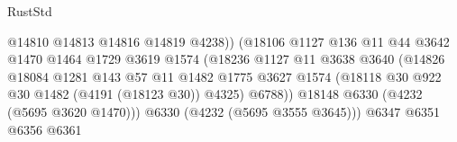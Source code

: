 \begin{lexlean}{RustStd}
\begin{coremodule}
                                                @14810
                                                @14813
                                                @14816
                                                @14819
                                                @4238))
                                            (@18106
                                              @1127
                                              @136
                                              @11
                                              @44
                                              @3642
                                              @1470
                                              @1464
                                              @1729
                                              @3619
                                              @1574
                                              (@18236
                                                @1127
                                                @11
                                                @3638
                                                @3640
                                                (@14826
                                                  @18084
                                                  @1281
                                                  @143
                                                  @57
                                                  @11
                                                  @1482
                                                  @1775
                                                  @3627
                                                  @1574
                                                  (@18118
                                                    @30
                                                    @922
                                                    @30
                                                    @1482
                                                    (@4191 (@18123 @30))
                                                    @4325)
                                                  @6788))
                                              @18148
                                              @6330
                                              (@4232 (@5695 @3620 @1470)))
                                            @6330
                                            (@4232 (@5695 @3555 @3645)))
                                          @6347
                                          @6351
                                          @6356
                                          @6361

\end{coremodule}
\end{lexlean}
